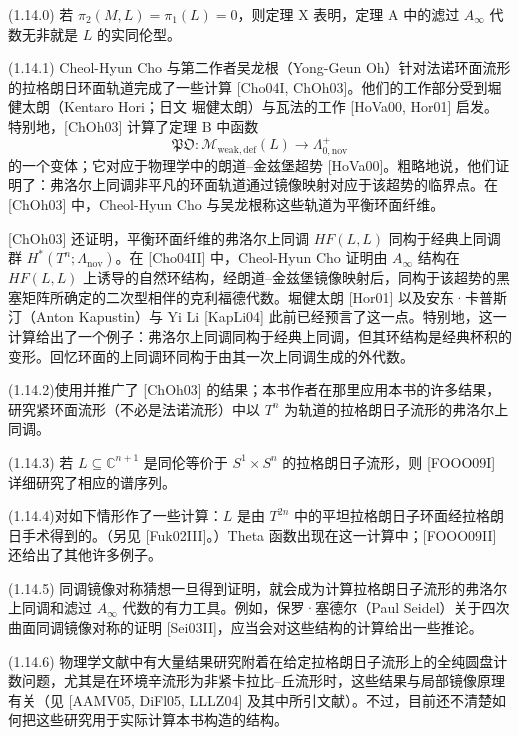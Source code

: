 \medskip
\noindent\textup{(1.14.0)}\quad
若 $\pi_2(M,L)=\pi_1(L)=0$，则定理 X 表明，定理 A 中的滤过
$A_\infty$ 代数无非就是 $L$ 的实同伦型。

\medskip
\noindent\textup{(1.14.1)}\quad
Cheol-Hyun Cho 与第二作者吴龙根（Yong-Geun Oh）针对法诺环面流形的拉格朗日环面轨道完成了一些计算 [Cho04I, ChOh03]。他们的工作部分受到堀健太朗（Kentaro Hori；日文 堀健太朗）与瓦法的工作 [HoVa00, Hor01] 启发。特别地，[ChOh03] 计算了定理 B 中函数
\[
  \mathfrak{PO}:\mathcal M_{\mathrm{weak,def}}(L)
  \longrightarrow\Lambda_{0,\mathrm{nov}}^+
\]
的一个变体；它对应于物理学中的朗道--金兹堡超势 [HoVa00]。粗略地说，他们证明了：弗洛尔上同调非平凡的环面轨道通过镜像映射对应于该超势的临界点。在 [ChOh03] 中，Cheol-Hyun Cho 与吴龙根称这些轨道为平衡环面纤维。

[ChOh03] 还证明，平衡环面纤维的弗洛尔上同调 $HF(L,L)$ 同构于经典上同调群
$H^*(T^n;\Lambda_{\mathrm{nov}})$。在 [Cho04II] 中，Cheol-Hyun Cho 证明由
$A_\infty$ 结构在 $HF(L,L)$ 上诱导的自然环结构，经朗道--金兹堡镜像映射后，同构于该超势的黑塞矩阵所确定的二次型相伴的克利福德代数。堀健太朗 [Hor01] 以及安东·卡普斯汀（Anton Kapustin）与 Yi Li [KapLi04] 此前已经预言了这一点。特别地，这一计算给出了一个例子：弗洛尔上同调同构于经典上同调，但其环结构是经典杯积的变形。回忆环面的上同调环同构于由其一次上同调生成的外代数。

\medskip
\noindent\textup{(1.14.2)} 使用并推广了 [ChOh03] 的结果；本书作者在那里应用本书的许多结果，研究紧环面流形（不必是法诺流形）中以 $T^n$ 为轨道的拉格朗日子流形的弗洛尔上同调。

\medskip
\noindent\textup{(1.14.3)}\quad
若 $L\subseteq\mathbb C^{n+1}$ 是同伦等价于 $S^1\times S^n$ 的拉格朗日子流形，则 [FOOO09I] 详细研究了相应的谱序列。

\medskip
\noindent\textup{(1.14.4)}\quad
[FOOO09II] 对如下情形作了一些计算：$L$ 是由 $T^{2n}$ 中的平坦拉格朗日子环面经拉格朗日手术得到的。（另见 [Fuk02III]。）Theta 函数出现在这一计算中；[FOOO09II] 还给出了其他许多例子。

\medskip
\noindent\textup{(1.14.5)}\quad
同调镜像对称猜想一旦得到证明，就会成为计算拉格朗日子流形的弗洛尔上同调和滤过 $A_\infty$ 代数的有力工具。例如，保罗·塞德尔（Paul Seidel）关于四次曲面同调镜像对称的证明 [Sei03II]，应当会对这些结构的计算给出一些推论。

\medskip
\noindent\textup{(1.14.6)}\quad
物理学文献中有大量结果研究附着在给定拉格朗日子流形上的全纯圆盘计数问题，尤其是在环境辛流形为非紧卡拉比--丘流形时，这些结果与局部镜像原理有关（见 [AAMV05, DiFl05, LLLZ04] 及其中所引文献）。不过，目前还不清楚如何把这些研究用于实际计算本书构造的结构。
